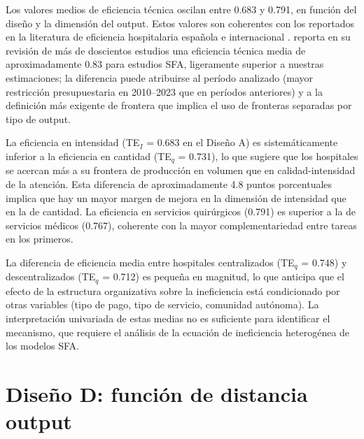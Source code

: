 \documentclass[12pt, a4paper, twoside, openright]{book}
\theoremstyle{plain}
\theoremstyle{definition}
\theoremstyle{remark}
\begin{document}
Los valores medios de eficiencia técnica oscilan entre 0.683 y 0.791, en función del diseño y la dimensión del output. Estos valores son coherentes con los reportados en la literatura de eficiencia hospitalaria española \citep{puigjunoy2000} e internacional \citep{hollingsworth2008,rosko2008}. \citet{hollingsworth2008} reporta en su revisión de más de doscientos estudios una eficiencia técnica media de aproximadamente 0.83 para estudios SFA, ligeramente superior a nuestras estimaciones; la diferencia puede atribuirse al período analizado (mayor restricción presupuestaria en 2010--2023 que en períodos anteriores) y a la definición más exigente de frontera que implica el uso de fronteras separadas por tipo de output.

La eficiencia en intensidad (TE$_I$ = 0.683 en el Diseño A) es sistemáticamente inferior a la eficiencia en cantidad (TE$_q$ = 0.731), lo que sugiere que los hospitales se acercan más a su frontera de producción en volumen que en calidad-intensidad de la atención. Esta diferencia de aproximadamente 4.8 puntos porcentuales implica que hay un mayor margen de mejora en la dimensión de intensidad que en la de cantidad. La eficiencia en servicios quirúrgicos (0.791) es superior a la de servicios médicos (0.767), coherente con la mayor complementariedad entre tareas en los primeros.

La diferencia de eficiencia media entre hospitales centralizados (TE$_q$ = 0.748) y descentralizados (TE$_q$ = 0.712) es pequeña en magnitud, lo que anticipa que el efecto de la estructura organizativa sobre la ineficiencia está condicionado por otras variables (tipo de pago, tipo de servicio, comunidad autónoma). La interpretación univariada de estas medias no es suficiente para identificar el mecanismo, que requiere el análisis de la ecuación de ineficiencia heterogénea de los modelos SFA.


\section{Diseño D: función de distancia output}
\end{document}
